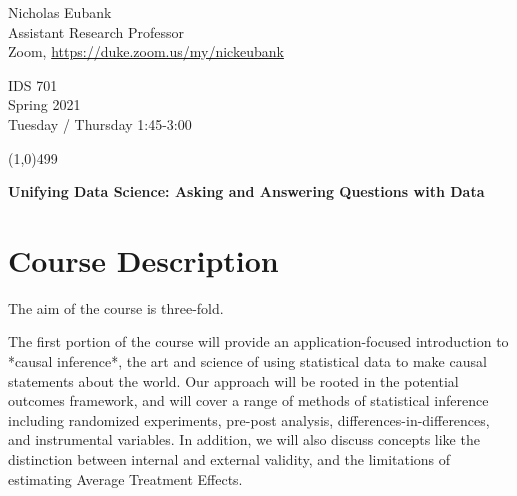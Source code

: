 \documentclass[12pt]{article}
\begin{document}
\singlespacing






\thispagestyle{empty}
\begin{minipage}[t]{.5\textwidth}
	Nicholas Eubank \\
	 Assistant Research Professor\\
	 Zoom, \url{https://duke.zoom.us/my/nickeubank}
     \vspace*{0.1cm}
\end{minipage}
\begin{minipage}[t]{.5\textwidth}
	\begin{flushright}  IDS 701 \\
	Spring 2021\\
	Tuesday / Thursday 1:45-3:00 
    \vspace*{0.1cm}
\end{flushright}
\end{minipage}


\line(1,0){499}

\vspace{.35in}

\begin{center}
	\textbf{\LARGE{Unifying Data Science: Asking and Answering Questions with Data} }
\end{center}








\section{Course Description}

The aim of the course is three-fold. 

The first portion of the course will provide an application-focused introduction to *causal inference*, the art and science of using statistical data to make causal statements about the world. Our approach will be rooted in the potential outcomes framework, and will cover a range of methods of statistical inference including randomized experiments, pre-post analysis, differences-in-differences, and instrumental variables. In addition, we will also discuss concepts like the distinction between internal and external validity, and the limitations of estimating Average Treatment Effects. 
\end{document}
